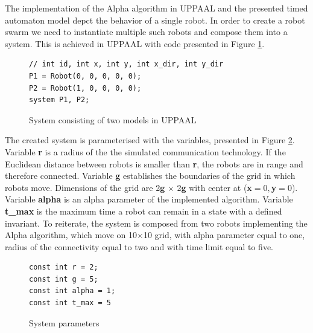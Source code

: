 The implementation of the Alpha algorithm in UPPAAL and the presented timed automaton model depct the behavior of a single robot. In order to create a robot swarm we need to instantiate multiple such robots and compose them into a system. This is achieved in UPPAAL with code presented in Figure \ref{fig:composition}.
\begin{figure}[H]
\caption{System consisting of two models in UPPAAL}
\lstset { language=C++ }
\begin{lstlisting}
// int id, int x, int y, int x_dir, int y_dir
P1 = Robot(0, 0, 0, 0, 0);
P2 = Robot(1, 0, 0, 0, 0);
system P1, P2;
\end{lstlisting}
\label{fig:composition}
\end{figure}

\noindent
The created system is parameterised with the variables, presented in Figure \ref{fig:parameters}. Variable \textbf{r} is a radius of the the simulated communication technology. If the Euclidean distance between robots is smaller than \textbf{r}, the robots are in range and therefore connected. Variable \textbf{g} establishes the boundaries of the grid in which robots move. Dimensions of the grid are 2\textbf{g} $\times$ 2\textbf{g} with center at (\textbf{x}$=0, $\textbf{y}$=0$). Variable \textbf{alpha} is an alpha parameter of the implemented algorithm. Variable \textbf{t\_max} is the maximum time a robot can remain in a state with a defined invariant. To reiterate, the system is composed from two robots implementing the Alpha algorithm, which move on 10$\times$10 grid, with alpha parameter equal to one, radius of the connectivity equal to two and with time limit equal to five.

\begin{figure}[H]
\caption{System parameters}
\lstset { language=C++ }
\begin{lstlisting}
const int r = 2;
const int g = 5;
const int alpha = 1;
const int t_max = 5
\end{lstlisting}
\label{fig:parameters}
\end{figure}

